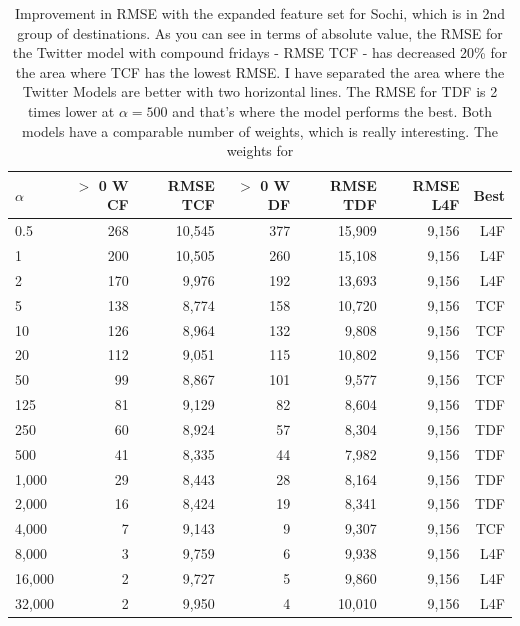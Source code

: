 \documentclass[minf,frontabs,twoside,singlespacing,parskip]{infthesis}
\begin{document}
\begin{table}[h!]
\begin{center}
\begin{tabular}{ l | r | r | r | r | r | r}
$\alpha$ & $>$ 0 W CF & RMSE TCF & $>$ 0 W DF & RMSE TDF & RMSE L4F & Best\\
\hline
0.5 & 268 & 10,545 & 377 & 15,909 & 9,156 & L4F\\
1 & 200 & 10,505 & 260 & 15,108 & 9,156 & L4F\\
2 & 170 & 9,976 & 192 & 13,693 & 9,156 & L4F\\
\hline
5 & 138 & 8,774 & 158 & 10,720 & 9,156 & TCF\\
10 & 126 & 8,964 & 132 & 9,808 & 9,156 & TCF\\
20 & 112 & 9,051 & 115 & 10,802 & 9,156 & TCF\\
50 & 99 & 8,867 & 101 & 9,577 & 9,156 & TCF\\
125 & 81 & 9,129 & 82 & 8,604 & 9,156 & TDF\\
250 & 60 & 8,924 & 57 & 8,304 & 9,156 & TDF\\
500 & 41 & 8,335 & 44 & 7,982 & 9,156 & TDF\\
1,000 & 29 & 8,443 & 28 & 8,164 & 9,156 & TDF\\
2,000 & 16 & 8,424 & 19 & 8,341 & 9,156 & TDF\\
4,000 & 7 & 9,143 & 9 & 9,307 & 9,156 & TCF\\
\hline
8,000 & 3 & 9,759 & 6 & 9,938 & 9,156 & L4F\\
16,000 & 2 & 9,727 & 5 & 9,860 & 9,156 & L4F\\
32,000 & 2 & 9,950 & 4 & 10,010 & 9,156 & L4F\\
\end{tabular}
\end{center}
\caption{Improvement in RMSE with the expanded feature set for Sochi, which is in 2nd group of destinations.  
As you can see in terms of absolute value, the RMSE for the Twitter model with compound fridays - RMSE TCF - has decreased 20\% for the area where TCF has the lowest RMSE. I have separated the area where the Twitter Models are better with two horizontal lines. The RMSE for TDF is 2 times lower at $\alpha=500$ and that's where the model performs the best. Both models have a comparable number of weights, which is really interesting. The weights for  }
\end{table}
\end{document}
